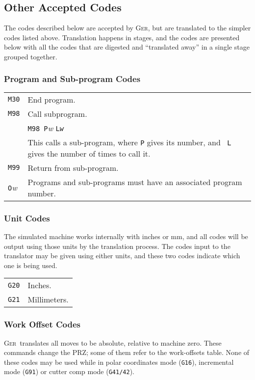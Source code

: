 \documentclass[titlepage,oneside,10pt]{article}
\newcommand{\ger}{\textsc{Ger}}
\begin{document}
\subsection{Other Accepted Codes}

The codes described below are accepted by \ger, but are translated to
the simpler codes listed above. Translation happens in stages, and the
codes are presented below with all the codes that are digested and
``translated away'' in a single stage grouped together. 

\subsubsection{Program and Sub-program Codes}

\begin{longtable}{lp{10cm}}
{\tt M30} & End program.\\
{\tt M98}&Call subprogram.\\
&{\tt M98 P}\emph{w} {\tt L\emph{w}}\\
& This calls a sub-program, where {\tt P} gives its number, and {\tt
  L} gives the number of times to call it.\\
{\tt M99} & Return from sub-program.\\
{\tt O}{\it w} & Programs and sub-programs must have an associated
program number. \\
\end{longtable}

\subsubsection{Unit Codes}

The simulated machine works internally with inches or mm, and all
codes will be output using those units by the translation process. The
codes input to the translator may be given using either units, and
these two codes indicate which one is being used.

\vskip 0.25cm
\begin{longtable}{lp{10cm}}
{\tt G20}&Inches.\\
{\tt G21}&Millimeters.
\end{longtable}

\subsubsection{Work Offset Codes}

\ger\ translates all moves to be absolute, relative to machine
zero. These commands change the PRZ; some of them refer to the
work-offsets table. None of these codes may be used while in polar
coordinates mode ({\tt G16}), incremental mode ({\tt G91}) or cutter
comp mode ({\tt G41/42}).
\end{document}
